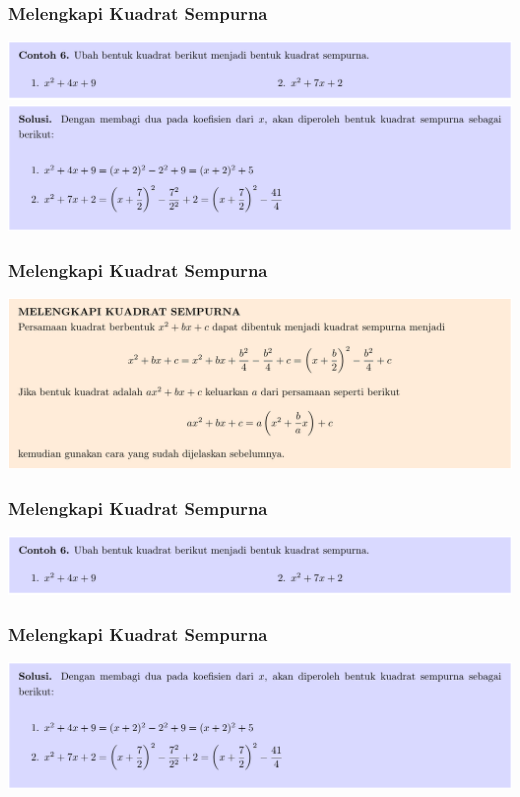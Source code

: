 \documentclass[pdflatex,compress,mathserif]{beamer}
\begin{document}
\begin{frame}
	\frametitle{Melengkapi Kuadrat Sempurna}
	\begin{center}
		\includegraphics[width=\linewidth]{img/img13}
		\includegraphics[width=\linewidth]{img/img14}
	\end{center}
\end{frame}

\begin{frame}
	\frametitle{Melengkapi Kuadrat Sempurna}
	\begin{center}
		\includegraphics[width=\linewidth]{img/img12}
	\end{center}
\end{frame}


\begin{frame}
	\frametitle{Melengkapi Kuadrat Sempurna}
	\begin{center}
		\includegraphics[width=\linewidth]{img/img13}
	\end{center}
\end{frame}


\begin{frame}
	\frametitle{Melengkapi Kuadrat Sempurna}
	\begin{center}
		\includegraphics[width=\linewidth]{img/img14}
	\end{center}
\end{frame}
\end{document}
